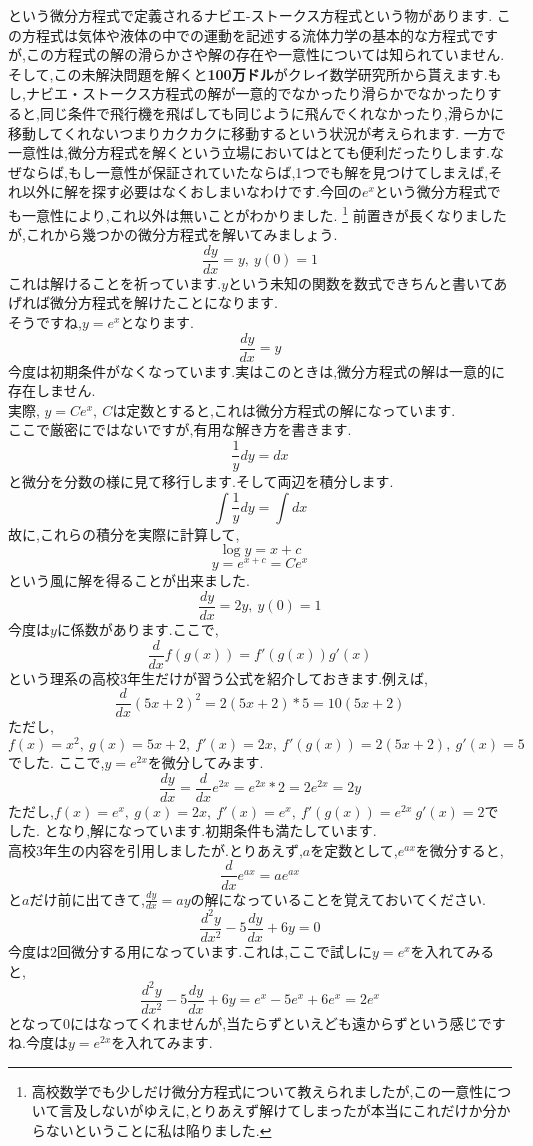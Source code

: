 という微分方程式で定義されるナビエ-ストークス方程式という物があります.
この方程式は気体や液体の中での運動を記述する流体力学の基本的な方程式ですが,この方程式の解の滑らかさや解の存在や一意性については知られていません.そして,この未解決問題を解くと{\bf 100万ドル}がクレイ数学研究所から貰えます.もし,ナビエ・ストークス方程式の解が一意的でなかったり滑らかでなかったりすると,同じ条件で飛行機を飛ばしても同じように飛んでくれなかったり,滑らかに移動してくれないつまりカクカクに移動するという状況が考えられます.
\exx
一方で一意性は,微分方程式を解くという立場においてはとても便利だったりします.なぜならば,もし一意性が保証されていたならば,1つでも解を見つけてしまえば,それ以外に解を探す必要はなくおしまいなわけです.今回の$e^x$という微分方程式でも一意性により,これ以外は無いことがわかりました.
\footnote{高校数学でも少しだけ微分方程式について教えられましたが,この一意性について言及しないがゆえに,とりあえず解けてしまったが本当にこれだけか分からないということに私は陥りました.}
前置きが長くなりましたが,これから幾つかの微分方程式を解いてみましょう.
\ex
\[
\frac{dy}{dx} = y ,\ y(0) = 1
\]
これは解けることを祈っています.$y$という未知の関数を数式できちんと書いてあげれば微分方程式を解けたことになります.\\
そうですね,$y = e^x$となります.
\exx
\ex
\[
\frac{dy}{dx} = y 
\]
今度は初期条件がなくなっています.実はこのときは,微分方程式の解は一意的に存在しません.\\
実際, $y = C e^x ,\ C$は定数とすると,これは微分方程式の解になっています.\\
ここで厳密にではないですが,有用な解き方を書きます.\\
\[
\frac{1}{y} dy = dx
\]
と微分を分数の様に見て移行します.そして両辺を積分します.
\[
\int \frac{1}{y} dy = \int dx
\]
故に,これらの積分を実際に計算して,
\[
\log y = x + c
\]
\[
y = e^{x+c} = C e^x
\]
という風に解を得ることが出来ました.
\exx
\ex
\[
\frac{dy}{dx} = 2y ,\ y(0)=1
\]
今度は$y$に係数があります.ここで,
\[
\frac{d}{dx}f(g(x)) = f'(g(x)) g'(x)
\]
という理系の高校3年生だけが習う公式を紹介しておきます.例えば,
\[
\frac{d}{dx}(5x+2)^2 = 2(5x+2) *5 = 10(5x+2)
\]
ただし,$f(x) = x^2 ,\ g(x) = 5x+2 ,\ f'(x) = 2x ,\ f'(g(x)) = 2(5x+2) , \ g'(x) = 5$でした.
ここで,$y=e^{2x}$を微分してみます.
\[
\frac{dy}{dx}  = \frac{d}{dx}e^{2x} = e^{2x} * 2 = 2 e^{2x} = 2y
\]
ただし,$f(x) = e^x ,\  g(x) =2x ,\  f'(x) = e^x ,\ f'(g(x)) = e^{2x}\ g'(x) =2 $でした.
となり,解になっています.初期条件も満たしています.\\
高校$3$年生の内容を引用しましたが.とりあえず,$a$を定数として,$e^{ax}$を微分すると,
\[
\frac{d}{dx}e^{ax} = ae^{ax}
\]
と$a$だけ前に出てきて,$\frac{dy}{dx} = ay$の解になっていることを覚えておいてください.
\exx
\ex
\[
\frac{d^2 y}{dx^2} - 5 \frac{dy}{dx} + 6y = 0
\]
今度は$2$回微分する用になっています.これは,ここで試しに$y=e^{x}$を入れてみると,
\[
\frac{d^2 y}{dx^2} - 5 \frac{dy}{dx} + 6y =  e^x - 5e^x + 6 e^x = 2e^x
\]
となって$0$にはなってくれませんが,当たらずといえども遠からずという感じですね.今度は$y=e^{2x}$を入れてみます.

